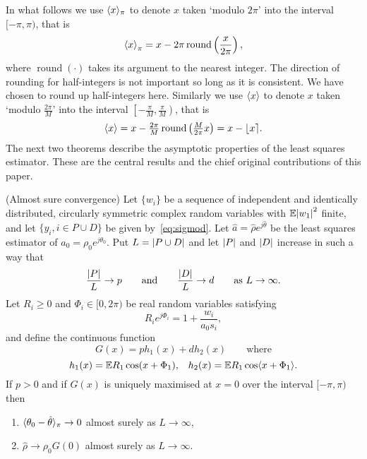 \documentclass[journal]{IEEEtran}
\begin{document}
In what follows we use $\langle x \rangle_\pi$ to denote $x$ taken `modulo $2\pi$' into the interval $[-\pi, \pi)$, that is
\[
\left\langle x \right\rangle_\pi = x - 2\pi\operatorname{round}\left(\frac{x}{2\pi}\right),
\]
where $\operatorname{round}(\cdot)$ takes its argument to the nearest integer.  The direction of rounding for half-integers is not important so long as it is consistent.  We have chosen to round up half-integers here.  Similarly we use $\langle x \rangle$ to denote $x$ taken `modulo $\tfrac{2\pi}{M}$' into the interval $\left[-\tfrac{\pi}{M}, \tfrac{\pi}{M}\right)$, that is
\[
\left\langle x \right\rangle = x - \tfrac{2\pi}{M}\operatorname{round}\left(\tfrac{M}{2\pi}x\right) = x - {\left\lfloor x \right\rceil}.
\]
The next two theorems describe the asymptotic properties of the least squares estimator.  These are the central results and the chief original contributions of this paper.

\begin{theorem}\label{thm:consistency} (Almost sure convergence)
Let $\{w_i\}$ be a sequence of independent and identically distributed, circularly symmetric complex random variables with ${\mathbb E} {\left\vert w_1 \right\vert}^2$ finite, and let $\{y_i, i \in P \cup D\}$ be given by~\eqref{eq:sigmod}.   Let $\hat{a} = \hat{\rho}e^{j\hat{\theta}}$ be the least squares estimator of $a_0 = \rho_0e^{j\theta_0}$. %
Put $L = {\left\vert P \cup D \right\vert}$ and let ${\left\vert P \right\vert}$ and ${\left\vert D \right\vert}$ increase in such a way that
\[
\frac{{\left\vert P \right\vert}}{L} \rightarrow p \qquad \text{and} \qquad \frac{{\left\vert D \right\vert}}{L} \rightarrow d \qquad \text{as $L \rightarrow \infty$.}
\] 
Let $R_i \geq 0$ and $\Phi_i \in [0,2\pi)$ be real random variables satisfying
\begin{equation}\label{eq:RiandPhii}
R_ie^{j\Phi_i} = 1 + \frac{w_i}{a_0 s_i} ,
\end{equation}
and define the continuous function
\[
G(x) = p h_1(x) + d h_2(x) \qquad \text{where}
\]
\[
h_1(x) = {\mathbb E} R_1 \cos(x + \Phi_1), \;\;\; h_2(x) =  {\mathbb E} R_1 \cos\langle  x + \Phi_1 \rangle.
\]
If $p > 0$ and if $G(x)$ is uniquely maximised at $x = 0$ over the interval $[-\pi,\pi)$ then
\begin{enumerate}
\item $\langle \theta_0 - \hat{\theta} \rangle_\pi \rightarrow 0$ almost surely as $L \rightarrow \infty$, \label{thm:consistency:part1}
\item $\hat{\rho} \rightarrow \rho_0 G(0)$ almost surely as $L \rightarrow \infty$. \label{thm:consistency:part2}
\end{enumerate}
\end{theorem}
\end{document}
